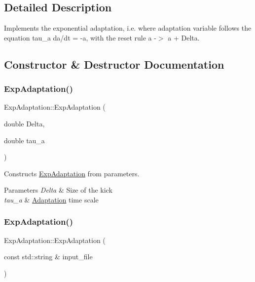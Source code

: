 \subsection{Detailed Description}
Implements the exponential adaptation, i.\+e. where adaptation variable follows the equation tau\+\_\+a da/dt = -\/a, with the reset rule a -\/$>$ a + Delta. 

\subsection{Constructor \& Destructor Documentation}
\mbox{\label{classExpAdaptation_a7cf74c9283d78b47b2ee49cf9bf4b3c3}} 
\subsubsection{\texorpdfstring{Exp\+Adaptation()}{ExpAdaptation()}\hspace{0.1cm}{\footnotesize\ttfamily [1/2]}}
{\footnotesize\ttfamily Exp\+Adaptation\+::\+Exp\+Adaptation (\begin{DoxyParamCaption}\item[{double}]{Delta,  }\item[{double}]{tau\+\_\+a }\end{DoxyParamCaption})}



Constructs \hyperlink{classExpAdaptation}{Exp\+Adaptation} from parameters. 


\begin{DoxyParams}{Parameters}
{\em Delta} & Size of the kick \\
\hline
{\em tau\+\_\+a} & \hyperlink{classAdaptation}{Adaptation} time scale \\
\hline
\end{DoxyParams}
\mbox{\label{classExpAdaptation_a451a3bb8244dcd086d05c06a54865568}} 
\subsubsection{\texorpdfstring{Exp\+Adaptation()}{ExpAdaptation()}\hspace{0.1cm}{\footnotesize\ttfamily [2/2]}}
{\footnotesize\ttfamily Exp\+Adaptation\+::\+Exp\+Adaptation (\begin{DoxyParamCaption}\item[{const std\+::string \&}]{input\+\_\+file }\end{DoxyParamCaption})}



